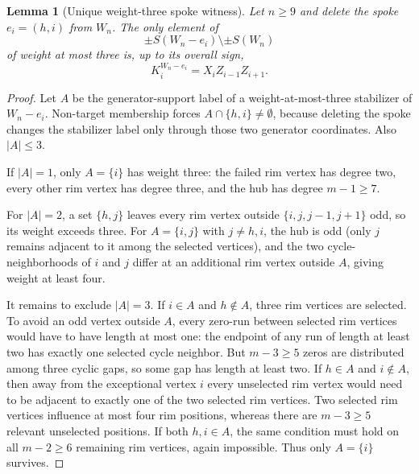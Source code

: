 \documentclass[11pt]{article}
\newtheorem{lemma}[theorem]{Lemma}
\theoremstyle{remark}
\begin{document}
\begin{lemma}[Unique weight-three spoke witness]\label{lem:spokeweight3}
Let $n\ge9$ and delete the spoke $e_i=(h,i)$ from $W_n$. The only element of
\[
\pm S(W_n-e_i)\setminus\pm S(W_n)
\]
of weight at most three is, up to its overall sign,
\[
K_i^{W_n-e_i}=X_iZ_{i-1}Z_{i+1}.
\]
\end{lemma}
\begin{proof}
Let $A$ be the generator-support label of a weight-at-most-three stabilizer of $W_n-e_i$. Non-target membership forces $A\cap\{h,i\}\ne\emptyset$, because deleting the spoke changes the stabilizer label only through those two generator coordinates. Also $|A|\le3$.

If $|A|=1$, only $A=\{i\}$ has weight three: the failed rim vertex has degree two, every other rim vertex has degree three, and the hub has degree $m-1\ge7$.

For $|A|=2$, a set $\{h,j\}$ leaves every rim vertex outside $\{i,j,j-1,j+1\}$ odd, so its weight exceeds three. For $A=\{i,j\}$ with $j\ne h,i$, the hub is odd (only $j$ remains adjacent to it among the selected vertices), and the two cycle-neighborhoods of $i$ and $j$ differ at an additional rim vertex outside $A$, giving weight at least four.

It remains to exclude $|A|=3$. If $i\in A$ and $h\notin A$, three rim vertices are selected. To avoid an odd vertex outside $A$, every zero-run between selected rim vertices would have to have length at most one: the endpoint of any run of length at least two has exactly one selected cycle neighbor. But $m-3\ge5$ zeros are distributed among three cyclic gaps, so some gap has length at least two. If $h\in A$ and $i\notin A$, then away from the exceptional vertex $i$ every unselected rim vertex would need to be adjacent to exactly one of the two selected rim vertices. Two selected rim vertices influence at most four rim positions, whereas there are $m-3\ge5$ relevant unselected positions. If both $h,i\in A$, the same condition must hold on all $m-2\ge6$ remaining rim vertices, again impossible. Thus only $A=\{i\}$ survives.
\end{proof}
\end{document}

